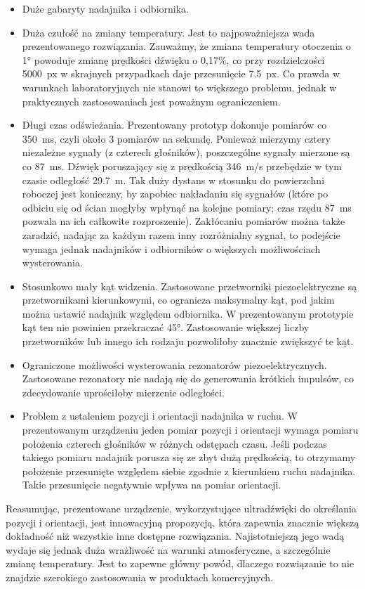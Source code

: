 \begin{itemize}
 \item Duże gabaryty nadajnika i odbiornika.
 
 \item Duża czułość na zmiany temperatury. Jest to najpoważniejsza wada prezentowanego rozwiązania.
 Zauważmy, że zmiana temperatury otoczenia o \ang{1} powoduje zmianę prędkości dźwięku o 0,17\%,
 co przy rozdzielczości \SI{5000}{px} w skrajnych przypadkach daje przesunięcie \SI{7.5}{px}.
 Co prawda w warunkach laboratoryjnych nie stanowi to większego problemu, jednak w praktycznych zastosowaniach
 jest poważnym ograniczeniem.
 
 \item Długi czas odświeżania. Prezentowany prototyp dokonuje pomiarów co \SI{350}{ms}, czyli około 3 pomiarów 
 na sekundę. Ponieważ mierzymy cztery niezależne sygnały (z czterech głośników), poszczególne sygnały mierzone są co \SI{87}{ms}.
  Dźwięk poruszający się z prędkością \SI{346}{m/s}  przebędzie  w tym czasie odległość \SI{29.7}{m}.
 Tak duży dystans w stosunku do powierzchni roboczej jest konieczny, by zapobiec nakładaniu się sygnałów
 (które po odbiciu się od ścian mogłyby wpłynąć na kolejne pomiary; czas rzędu \SI{87}{ms} pozwala 
 na ich całkowite rozproszenie).
 Zakłócaniu pomiarów można także zaradzić, nadając za każdym razem inny rozróżnialny sygnał, to podejście 
 wymaga jednak nadajników i odbiorników o większych możliwościach wysterowania.
 
 \item Stosunkowo mały kąt widzenia. Zastosowane przetworniki piezoelektryczne są przetwornikami kierunkowymi, co 
 ogranicza  maksymalny kąt, pod jakim można ustawić nadajnik względem odbiornika. W prezentowanym 
 prototypie kąt ten nie powinien przekraczać \ang{45}. Zastosowanie większej liczby przetworników lub innego ich rodzaju
 pozwoliłoby znacznie zwiększyć te kąt.

 \item Ograniczone możliwości wysterowania rezonatorów piezoelektrycznych. 
 Zastosowane rezonatory nie nadają się do generowania krótkich impulsów, co zdecydowanie uprościłoby mierzenie odległości.
 
 \item Problem z ustaleniem pozycji i orientacji nadajnika w ruchu. W prezentowanym urządzeniu 
 jeden pomiar pozycji i orientacji wymaga pomiaru położenia czterech głośników w różnych odstępach czasu.
 Jeśli podczas takiego pomiaru nadajnik porusza się ze zbyt dużą prędkością, to otrzymamy położenie
 przesunięte względem siebie zgodnie z kierunkiem ruchu nadajnika. Takie przesunięcie negatywnie wpływa na 
 pomiar orientacji. 
\end{itemize}


Reasumując, prezentowane urządzenie, wykorzystujące ultradźwięki do określania pozycji i orientacji,
jest innowacyjną propozycją, która zapewnia znacznie większą dokładność niż wszystkie inne dostępne rozwiązania.
Najistotniejszą jego wadą wydaje się jednak duża wrażliwość na warunki atmosferyczne, a szczególnie zmianę temperatury.
Jest to zapewne główny powód, dlaczego rozwiązanie to nie znajdzie  szerokiego zastosowania w produktach komercyjnych.



